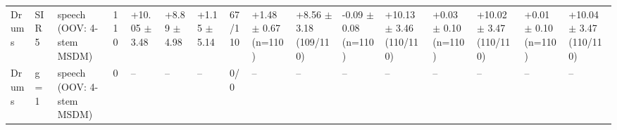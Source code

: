 \begin{tabular}{llllllllllllllll}
Drums & SIR 5 & speech (OOV: 4-stem MSDM) & 110 & +10.05 $\pm$ 3.48 & +8.89 $\pm$ 4.98 & +1.15 $\pm$ 5.14 & 67/110 & +1.48 $\pm$ 0.67 (n=110) & +8.56 $\pm$ 3.18 (109/110) & -0.09 $\pm$ 0.08 (n=110) & +10.13 $\pm$ 3.46 (110/110) & +0.03 $\pm$ 0.10 (n=110) & +10.02 $\pm$ 3.47 (110/110) & +0.01 $\pm$ 0.10 (n=110) & +10.04 $\pm$ 3.47 (110/110)\\
Drums & g = 1 & speech (OOV: 4-stem MSDM) & 0 & -- & -- & -- & 0/0 & -- & -- & -- & -- & -- & -- & -- & --\\
\bottomrule
\end{tabular}
